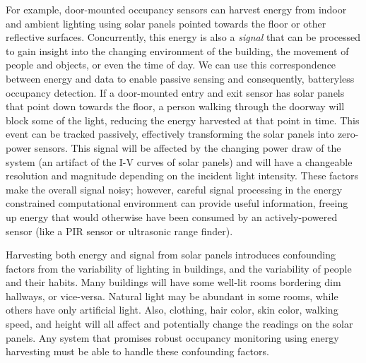 For example, door-mounted occupancy sensors can harvest energy from indoor and ambient lighting using solar panels pointed towards the floor or other reflective surfaces.
Concurrently, this energy is also a \textit{signal} that can be processed to gain insight into the changing environment of the building, the movement of people and objects, or even the time of day.
We can use this correspondence between energy and data to enable passive sensing and consequently, batteryless occupancy detection.
If a door-mounted entry and exit sensor has solar panels that point down towards the floor, a person walking through the doorway will block some of the light, reducing the energy harvested at that point in time.
This event can be tracked passively, effectively transforming the solar panels into zero-power sensors.
This signal will be affected by the changing power draw of the system (an artifact of the I-V curves of solar panels) and will have a changeable resolution and magnitude depending on the incident light intensity.
These factors make the overall signal noisy; however, careful signal processing in the energy constrained computational environment can provide useful information, freeing up energy that would otherwise have been consumed by an actively-powered sensor (like a PIR sensor or ultrasonic range finder).

Harvesting both energy and signal from solar panels introduces confounding factors from the variability of lighting in buildings, and the variability of people and their habits.
Many buildings will have some well-lit rooms bordering dim hallways, or vice-versa.
Natural light may be abundant in some rooms, while others have only artificial light.
Also, clothing, hair color, skin color, walking speed, and height will all affect and potentially change the readings on the solar panels.  
Any system that promises robust occupancy monitoring using energy harvesting must be able to handle these  confounding factors.





